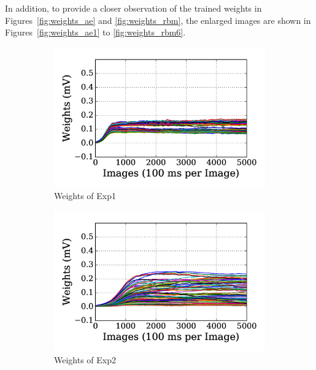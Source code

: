 In addition, to provide a closer observation of the trained weights in Figures~\ref{fig:weights_ae} and \ref{fig:weights_rbm}, the enlarged images are shown in Figures~\ref{fig:weights_ae1} to \ref{fig:weights_rbm6}.
\begin{figure}
	\centering
	\begin{subfigure}[t]{0.48\textwidth}
		\includegraphics[width=\textwidth]{pics_sdlm/01_exp_SAE_Orig_long/exp1_weights_s.png}
		\caption{Weights of Exp1}
	\end{subfigure}
	\begin{subfigure}[t]{0.48\textwidth}
		\includegraphics[width=\textwidth]{pics_sdlm/01_exp_SAE_Orig_long/exp2_weights_s.png}
		\caption{Weights of Exp2}
	\end{subfigure}
	\begin{subfigure}[t]{0.48\textwidth}

\end{subfigure}
\end{figure}
